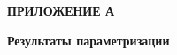 \begin{center}
    \textbf{ПРИЛОЖЕНИЕ А}
\end{center}
\begin{center}
    \textbf{Результаты параметризации}
\end{center}